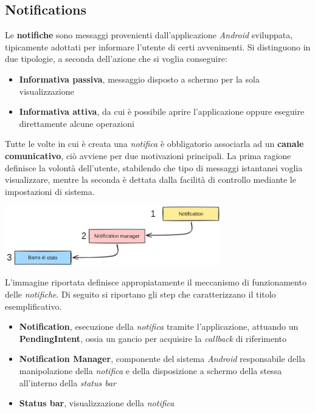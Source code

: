 \documentclass{article}
\begin{document}
\subsection*{Notifications}
Le \textbf{notifiche} sono messaggi provenienti dall'applicazione \textit{Android} sviluppata, tipicamente adottati per informare l'utente di certi avvenimenti. Si distinguono in due tipologie, a seconda dell'azione che si voglia conseguire:
\begin{itemize}[label={-}]
  \itemsep0em
  \item \textbf{Informativa passiva}, messaggio disposto a schermo per la sola visualizzazione
  \item \textbf{Informativa attiva}, da cui è possibile aprire l'applicazione oppure eseguire direttamente alcune operazioni
\end{itemize}
Tutte le volte in cui è creata una \textit{notifica} è obbligatorio associarla ad un \textbf{canale comunicativo}, ciò avviene per due motivazioni principali. La prima ragione definisce la volontà dell'utente, stabilendo che tipo di messaggi istantanei voglia visualizzare, mentre la seconda è dettata dalla facilità di controllo mediante le impostazioni di sistema. 
\begin{center}
  \includegraphics*[width=0.7\textwidth]{foto1.png}
\end{center}
L'immagine riportata definisce appropiatamente il meccanismo di funzionamento delle \textit{notifiche}. Di seguito si riportano gli step che caratterizzano il titolo esemplificativo.
\begin{itemize}[label={-}]
  \itemsep0em
  \item \textbf{Notification}, esecuzione della \textit{notifica} tramite l'applicazione, attuando un \textbf{PendingIntent}, ossia un gancio per acquisire la \textit{callback} di riferimento
  \item \textbf{Notification Manager}, componente del sistema \textit{Android} responsabile della manipolazione della \textit{notifica} e della disposizione a schermo della stessa all'interno della \textit{status bar}
  \item \textbf{Status bar}, visualizzazione della \textit{notifica} 
\end{itemize}
\end{document}
